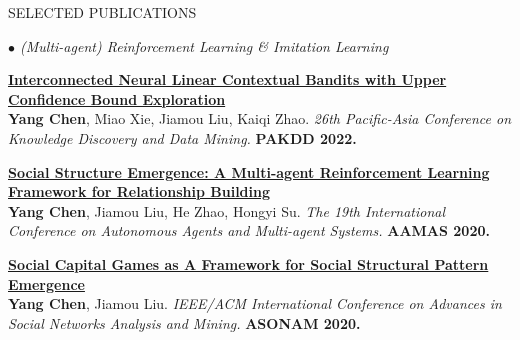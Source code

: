 \documentclass{resume} %
\begin{document}
\begin{rSection}{SELECTED PUBLICATIONS}
\begin{rSubsection}{\large\em $\bullet$ (Multi-agent) Reinforcement Learning \& Imitation Learning}{}{}{}
	\item {\href{https://link.springer.com/chapter/10.1007/978-3-031-05933-9_14}{\bf Interconnected Neural Linear Contextual Bandits with Upper Confidence Bound Exploration}}\\
		\textbf{Yang Chen}, Miao Xie, Jiamou Liu, Kaiqi Zhao. {\em 26th Pacific-Asia Conference on Knowledge Discovery and Data Mining.} \textbf{PAKDD 2022.} \\
	\item {\href{http://www.ifaamas.org/Proceedings/aamas2020/pdfs/p1807.pdf}{\bf Social Structure Emergence: A Multi-agent Reinforcement Learning Framework for Relationship Building}}\\ 
		\textbf{Yang Chen}, Jiamou Liu, He Zhao, Hongyi Su. {\em The 19th International Conference on Autonomous Agents and Multi-agent Systems.} \textbf{AAMAS 2020.}\\
	\item {\href{https://web.ntpu.edu.tw/~myday/doc/ASONAM2020/ASONAM2020_Proceedings/pdf/papers/049_064_309.pdf}{\bf Social Capital Games as A Framework for Social Structural Pattern Emergence}}\\ 
		\textbf{Yang Chen}, Jiamou Liu. {\em IEEE/ACM International Conference on Advances in Social Networks Analysis and Mining.} \textbf{ASONAM 2020.}\\
\end{rSubsection}


\end{rSection}
\end{document}
